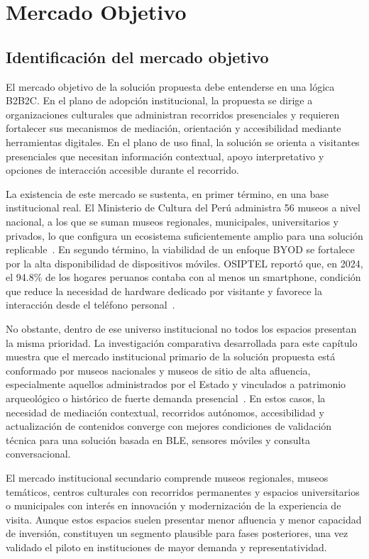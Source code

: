 \chapter{Mercado Objetivo}

\section{Identificación del mercado objetivo}

El mercado objetivo de la solución propuesta debe entenderse en una lógica B2B2C. En el plano de adopción institucional, la propuesta se dirige a organizaciones culturales que administran recorridos presenciales y requieren fortalecer sus mecanismos de mediación, orientación y accesibilidad mediante herramientas digitales. En el plano de uso final, la solución se orienta a visitantes presenciales que necesitan información contextual, apoyo interpretativo y opciones de interacción accesible durante el recorrido.

La existencia de este mercado se sustenta, en primer término, en una base institucional real. El Ministerio de Cultura del Perú administra 56 museos a nivel nacional, a los que se suman museos regionales, municipales, universitarios y privados, lo que configura un ecosistema suficientemente amplio para una solución replicable~\cite{museoscultura}. En segundo término, la viabilidad de un enfoque BYOD se fortalece por la alta disponibilidad de dispositivos móviles. OSIPTEL reportó que, en 2024, el 94.8\% de los hogares peruanos contaba con al menos un smartphone, condición que reduce la necesidad de hardware dedicado por visitante y favorece la interacción desde el teléfono personal~\cite{osiptel2024smartphone}.

No obstante, dentro de ese universo institucional no todos los espacios presentan la misma prioridad. La investigación comparativa desarrollada para este capítulo muestra que el mercado institucional primario de la solución propuesta está conformado por museos nacionales y museos de sitio de alta afluencia, especialmente aquellos administrados por el Estado y vinculados a patrimonio arqueológico o histórico de fuerte demanda presencial~\cite{infocultura2023visitantes,naylamp2023visitantes}. En estos casos, la necesidad de mediación contextual, recorridos autónomos, accesibilidad y actualización de contenidos converge con mejores condiciones de validación técnica para una solución basada en BLE, sensores móviles y consulta conversacional.

El mercado institucional secundario comprende museos regionales, museos temáticos, centros culturales con recorridos permanentes y espacios universitarios o municipales con interés en innovación y modernización de la experiencia de visita. Aunque estos espacios suelen presentar menor afluencia y menor capacidad de inversión, constituyen un segmento plausible para fases posteriores, una vez validado el piloto en instituciones de mayor demanda y representatividad.

